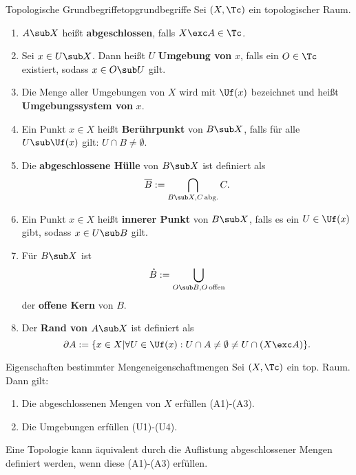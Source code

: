 \begin{definition}{Topologische Grundbegriffe}{topgrundbegriffe}
Sei $(X, \Tc)$ ein topologischer Raum.
\begin{enumerate}
\item $A \sub X$ heißt \textbf{abgeschlossen}, falls $X \exc A \in \Tc$.
\item Sei $x \in U \sub X$. Dann heißt $U$ \textbf{Umgebung von} $x$, falls ein $O \in \Tc$ existiert, sodass $x \in O \sub U$ gilt.
\item Die Menge aller Umgebungen von $X$ wird mit $\Uf (x)$ bezeichnet und heißt \textbf{Umgebungssystem von} $x$. 
\item Ein Punkt $x \in X$ heißt \textbf{Berührpunkt} von $B \sub X$, falls für alle $U \sub \Uf(x)$ gilt: $U \cap B \neq \emptyset$.
\item Die \textbf{abgeschlossene Hülle} von $B \sub X$ ist definiert als 
\begin{equation}
\overline{B} := \bigcap_{B \sub X, C \, \text{abg.}} C.
\end{equation}
\item Ein Punkt $x \in X$ heißt \textbf{innerer Punkt} von $B \sub X$, falls es ein $U \in \Uf(x)$ gibt, sodass $x \in U \sub B$ gilt.
\item Für $B \sub X$ ist 
\begin{equation}
\mathring{B} := \bigcup_{O \sub B, O \, \text{offen}}
\end{equation}
der \textbf{offene Kern} von $B$.
\item Der \textbf{Rand von} $A \sub X$ ist definiert als
\begin{equation}
\partial A:= \{x \in X|\forall U \in \Uf(x): U \cap A \neq \emptyset \neq U \cap (X \exc A)\}.
\end{equation}
\end{enumerate}
\end{definition}
\begin{satz}{Eigenschaften bestimmter Mengen}{eigenschaftmengen}
Sei $(X, \Tc)$ ein top. Raum. Dann gilt:
\begin{enumerate}
\item Die abgeschlossenen Mengen von $X$ erfüllen (A1)-(A3).
\item Die Umgebungen erfüllen (U1)-(U4).
\end{enumerate}
\end{satz}
\begin{bemerkung}
Eine Topologie kann äquivalent durch die Auflistung abgeschlossener Mengen definiert werden, wenn diese (A1)-(A3) erfüllen.
\end{bemerkung}
